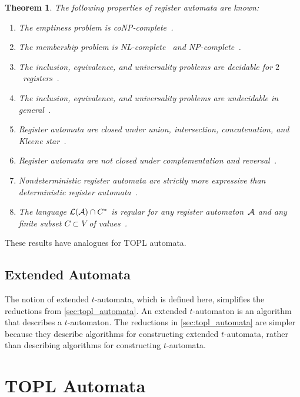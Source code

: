 \documentclass{article} %
\newtheorem{theorem}{Theorem}
\theoremstyle{definition}
\theoremstyle{remark}
\begin{document}
\begin{theorem}\label{th:ra}
The following properties of register automata are known:
\begin{enumerate}
\item The emptiness problem is coNP-complete~\cite{dblp:journals/tcs/sakamotoi00}.
\item The membership problem is NL-complete~\cite{dblp:conf/mfcs/nevensv01} and NP-complete~\cite{dblp:journals/tcs/sakamotoi00}.
\item The inclusion, equivalence, and universality problems are decidable for $2$~registers~\cite{dblp:conf/focs/kaminskif90,dblp:conf/mfcs/nevensv01}.
\item The inclusion, equivalence, and universality problems are undecidable in general~\cite{dblp:conf/mfcs/nevensv01}.
\item Register automata are closed under union, intersection, concatenation, and Kleene star~\cite{dblp:conf/focs/kaminskif90}.
\item Register automata are \emph{not} closed under complementation and reversal~\cite{dblp:conf/focs/kaminskif90}.
\item Nondeterministic register automata are strictly more expressive than deterministic register automata~\cite{dblp:conf/focs/kaminskif90}.
\item The language ${\cal L}({\cal A})\cap C^*$ is regular for any register automaton~${\cal A}$ and any finite subset $C\subset V$ of values~\cite{dblp:conf/focs/kaminskif90}.
\end{enumerate}
\end{theorem}

These results have analogues for TOPL automata.

\subsection{Extended Automata}

The notion of extended $t$-automata, which is defined here, simplifies the reductions from \autoref{sec:topl_automata}.
An extended $t$-automaton is an algorithm that describes a $t$-automaton.
The reductions in \autoref{sec:topl_automata} are simpler because they describe algorithms for constructing extended $t$-automata, rather than describing algorithms for constructing $t$-automata.


\section{TOPL Automata}\label{sec:topl_automata} %
\end{document}
